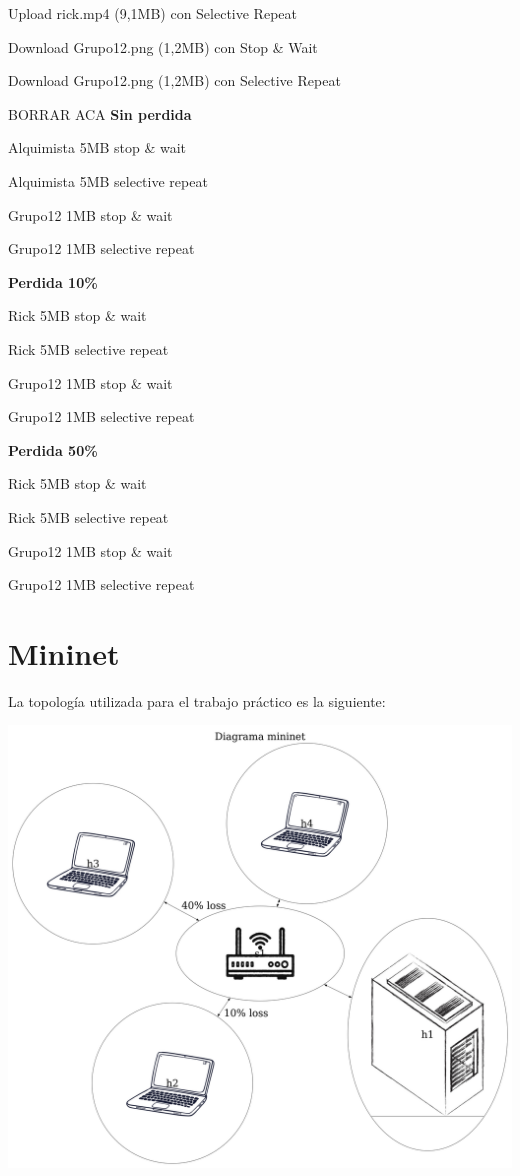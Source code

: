 \documentclass{article}
\begin{document}
Upload rick.mp4 (9,1MB) con Selective Repeat


Download Grupo12.png (1,2MB) con Stop & Wait

Download Grupo12.png (1,2MB) con Selective Repeat


BORRAR ACA
\textbf{Sin perdida}

Alquimista 5MB stop \& wait

Alquimista 5MB selective repeat

Grupo12 1MB stop \& wait

Grupo12 1MB selective repeat

\textbf{Perdida 10\%}

Rick 5MB stop \& wait

Rick 5MB selective repeat

Grupo12 1MB stop \& wait

Grupo12 1MB selective repeat

\textbf{Perdida 50\%}

Rick 5MB stop \& wait

Rick 5MB selective repeat

Grupo12 1MB stop \& wait

Grupo12 1MB selective repeat

\section{\texorpdfstring{\textbf{Mininet}}{Mininet}}\label{mininet}

La topología utilizada para el trabajo práctico es la siguiente:

\begin{center}
\includegraphics[scale=0.09999999999]{diagramaMininet}
\end{center}
\end{document}
